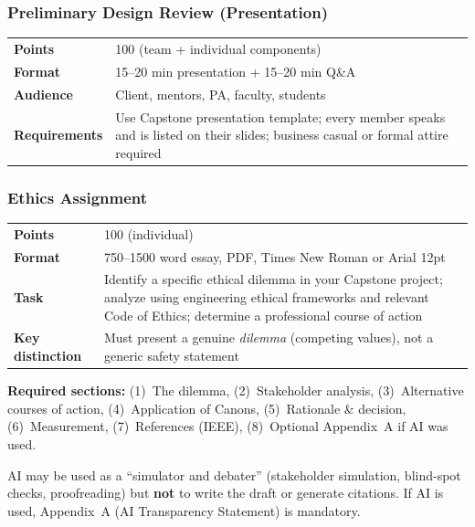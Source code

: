 \subsubsection{Preliminary Design Review (Presentation)}
\label{sssec:pdr-presentation}

\begin{tabularx}{\textwidth}{lX}
\toprule
\textbf{Points} & 100 (team + individual components) \\
\textbf{Format} & 15--20 min presentation + 15--20 min Q\&A \\
\textbf{Audience} & Client, mentors, PA, faculty, students \\
\textbf{Requirements} & Use Capstone presentation template; every member speaks and is listed on their slides; business casual or formal attire required \\
\bottomrule
\end{tabularx}

\subsubsection{Ethics Assignment}
\label{sssec:ethics}

\begin{tabularx}{\textwidth}{lX}
\toprule
\textbf{Points} & 100 (individual) \\
\textbf{Format} & 750--1500 word essay, PDF, Times New Roman or Arial 12pt \\
\textbf{Task} & Identify a specific ethical dilemma in your Capstone project; analyze using engineering ethical frameworks and relevant Code of Ethics; determine a professional course of action \\
\textbf{Key distinction} & Must present a genuine \emph{dilemma} (competing values), not a generic safety statement \\
\bottomrule
\end{tabularx}

\noindent\textbf{Required sections:} (1)~The dilemma, (2)~Stakeholder analysis, (3)~Alternative courses of action, (4)~Application of Canons, (5)~Rationale \& decision, (6)~Measurement, (7)~References (IEEE), (8)~Optional Appendix~A if AI was used.

\begin{warnbox}
AI may be used as a ``simulator and debater'' (stakeholder simulation, blind-spot checks, proofreading) but \textbf{not} to write the draft or generate citations. If AI is used, Appendix~A (AI Transparency Statement) is mandatory.
\end{warnbox}

